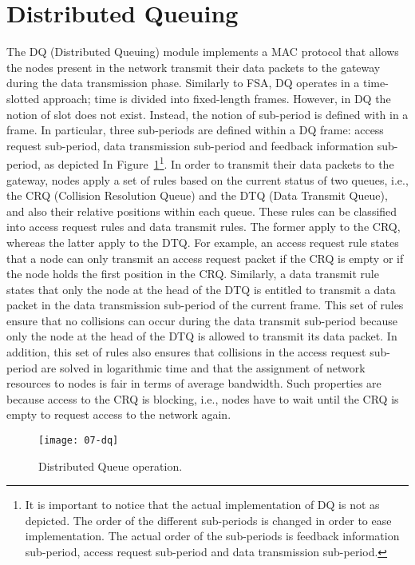 \section{Distributed Queuing}
The DQ (Distributed Queuing) module implements a MAC protocol that allows the nodes present in the network transmit their data packets to the gateway during the data transmission phase. Similarly to FSA, DQ operates in a time-slotted approach; time is divided into fixed-length frames. However, in DQ the notion of slot does not exist. Instead, the notion of sub-period is defined with in a frame. In particular, three sub-periods are defined within a DQ frame: access request sub-period, data transmission sub-period and feedback information sub-period, as depicted In Figure~\ref{fig:07-dq}\footnote{It is important to notice that the actual implementation of DQ is not as depicted. The order of the different sub-periods is changed in order to ease implementation. The actual order of the sub-periods is feedback information sub-period, access request sub-period and data transmission sub-period.}. In order to transmit their data packets to the gateway, nodes apply a set of rules based on the current status of two queues, i.e., the CRQ (Collision Resolution Queue) and the DTQ (Data Transmit Queue), and also their relative positions within each queue. These rules can be classified into access request rules and data transmit rules. The former apply to the CRQ, whereas the latter apply to the DTQ. For example, an access request rule states that a node can only transmit an access request packet if the CRQ is empty or if the node holds the first position in the CRQ. Similarly, a data transmit rule states that only the node at the head of the DTQ is entitled to transmit a data packet in the data transmission sub-period of the current frame. This set of rules ensure that no collisions can occur during the data transmit sub-period because only the node at the head of the DTQ is allowed to transmit its data packet. In addition, this set of rules also ensures that collisions in the access request sub-period are solved in logarithmic time and that the assignment of network resources to nodes is fair in terms of average bandwidth. Such properties are because access to the CRQ is blocking, i.e., nodes have to wait until the CRQ is empty to request access to the network again.

\begin{figure}[!ht]
    \centering
	\texttt{[image: 07-dq]}
    \caption{Distributed Queue operation.}
    \label{fig:07-dq}
\end{figure}

